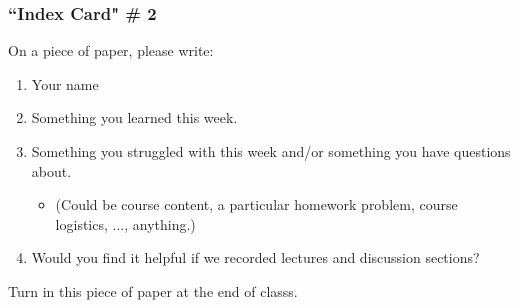 \documentclass[12pt, 
hyperref={colorlinks=true, linkcolor=blue, urlcolor=cyan}]{beamer}
\begin{document}
\begin{frame}
\frametitle{``Index Card" \# 2}
On a piece of paper, please write:
\begin{enumerate}
\item Your name
\item Something you learned this week.
\item Something you struggled with this week and/or something you have questions about. 
	\begin{itemize}
	\item[] \begin{footnotesize} (Could be course content, a particular homework problem, course logistics, ..., anything.) \end{footnotesize}
	\end{itemize}
\item Would you find it helpful if we recorded lectures and discussion sections?
\end{enumerate}
Turn in this piece of paper at the end of classs.
\end{frame}

\end{document}
